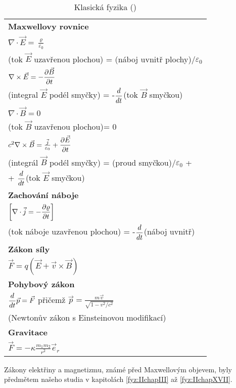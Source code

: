 {  \begin{table}[ht!]      %
    \centering
    \begin{tabular}{l}
       \hline 
       \textbf{Maxwellovy rovnice}              \\
       \(\nabla\cdot\vec{E} = \frac{\varrho}{\varepsilon_0}\) \\
       (tok \(\vec{E}\) uzavřenou plochou) = (náboj uvnitř plochy)/\(\varepsilon_0\)  \\
       \(\nabla\times\vec{E} = -\dfrac{\partial \vec{B}}{\partial t}\)    \\
       (integral \(\vec{E}\) podél smyčky) = -\(\dfrac{d  }{d t}\)(tok \(\vec{B}\) smyčkou) \\
       \(\nabla\cdot\vec{B} = 0\)                    \\
       (tok \(\vec{B}\) uzavřenou plochou)= 0        \\
       \(c^2\nabla\times\vec{B} = \frac{\vec{j}}{\varepsilon_0} + \dfrac{\partial \vec{E}}{\partial t}\) \\
       (integrál \(\vec{B}\) podél smyčky) =  (proud smyčkou)/\(\varepsilon_0\) +  \\
        + \(\dfrac{d }{d t}\)(tok \(\vec{E}\) smyčkou)       \\
       \hline 
       \textbf{Zachování náboje}  \\
       \(\left[\nabla\cdot\vec{j} = -\dfrac{\partial \varrho}{\partial t}\right]\)  \\
       (tok náboje uzavřenou plochou) = -\(\dfrac{d  }{d t}\)(náboj uvnitř) \\
       \hline
       \textbf{Zákon síly}  \\
       \(\vec{F} = q(\vec{E} + \vec{v}\times\vec{B})\)       \\
       \hline
       \textbf{Pohybový zákon}  \\
       \(\dfrac{d }{d t}\vec{p} = \vec{F}\)  
       přičemž \(\vec{p} = \frac{m\vec{v}}{\sqrt{1-v^2/c^2}}\)   \\
       (Newtonův zákon s Einsteinovou modifikací)                 \\
       \hline
       \textbf{Gravitace}               \\
       \(\vec{F} = -\kappa\frac{m_1m_2}{r^2}\vec{e}_r\)    \\
       \hline
    \end{tabular}
    \caption{Klasická fyzika (\cite[s.~318]{Feynman02})}
    \label{fyz:tab010}
  \end{table}
    
  Zákony elektřiny a magnetizmu, známé před Maxwellovým objevem, byly předmětem našeho studia v 
  kapitolách \ref{fyz:IIchapIII} až \ref{fyz:IIchapXVII}. 
  
}
